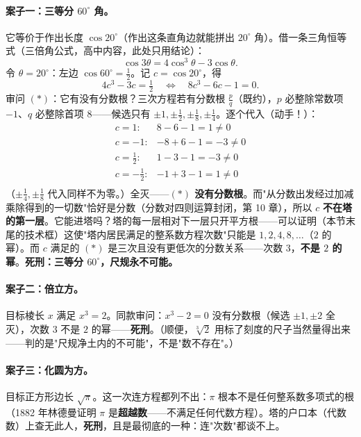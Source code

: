 \paragraph{案子一：三等分 $60^\circ$ 角。}它等价于作出长度 $\cos 20^\circ$（作出这条直角边就能拼出 $20^\circ$ 角）。借一条三角恒等式（三倍角公式，高中内容，此处只用结论）：
\[
\cos 3\theta = 4\cos^3\theta - 3\cos\theta .
\]
令 $\theta = 20^\circ$：左边 $\cos 60^\circ = \tfrac12$。记 $c = \cos 20^\circ$，得
\[
4c^3 - 3c = \tfrac12 \quad\Longleftrightarrow\quad 8c^3 - 6c - 1 = 0 . \tag{$*$}
\]
审问 $(*)$：它有没有分数根？三次方程若有分数根 $\tfrac pq$（既约），$p$ 必整除常数项 $-1$、$q$ 必整除首项 $8$——候选只有 $\pm1, \pm\tfrac12, \pm\tfrac18, \pm\tfrac14$。逐个代入（动手！）：
\[
\begin{array}{ll}
c = 1: & 8 - 6 - 1 = 1 \ne 0 \\
c = -1: & -8 + 6 - 1 = -3 \ne 0 \\
c = \tfrac12: & 1 - 3 - 1 = -3 \ne 0 \\
c = -\tfrac12: & -1 + 3 - 1 = 1 \ne 0 \\
\end{array}
\]
（$\pm\tfrac14, \pm\tfrac18$ 代入同样不为零。）全灭——\textbf{$(*)$ 没有分数根}。而"从分数出发经过加减乘除得到的一切数"恰好是分数（分数对四则运算封闭，第 10 章），所以 $c$ \textbf{不在塔的第一层}。它能进塔吗？塔的每一层相对下一层只开平方根——可以证明（本节末尾的技术框）这使"塔内居民满足的整系数方程次数"只能是 $1, 2, 4, 8, \dots$（$2$ 的幂）。而 $c$ 满足的 $(*)$ 是三次且没有更低次的分数关系——次数 $3$，\textbf{不是 $2$ 的幂}。\textbf{死刑：三等分 $60^\circ$，尺规永不可能。}

\paragraph{案子二：倍立方。}目标棱长 $x$ 满足 $x^3 = 2$。同款审问：$x^3 - 2 = 0$ 没有分数根（候选 $\pm1, \pm2$ 全灭），次数 $3$ 不是 $2$ 的幂——\textbf{死刑}。（顺便，$\sqrt[3]{2}$ 用标了刻度的尺子当然量得出来——判的是"尺规净土内的不可能"，不是"数不存在"。）

\paragraph{案子三：化圆为方。}目标正方形边长 $\sqrt\pi$。这一次连方程都列不出：$\pi$ 根本不是任何整系数多项式的根（1882 年林德曼证明 $\pi$ 是\textbf{超越数}——不满足任何代数方程）。塔的户口本（代数数）上查无此人，\textbf{死刑}，且是最彻底的一种：连"次数"都谈不上。

